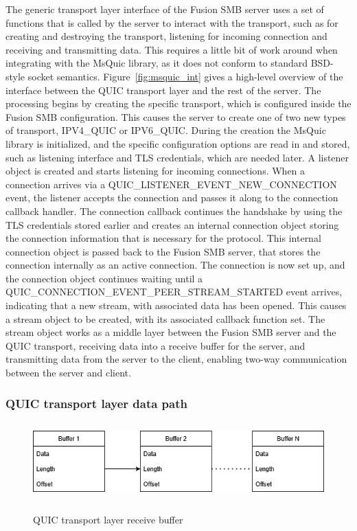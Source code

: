 \documentclass[english, 12pt, a4paper, elec, utf8, a-2b, online]{aaltothesis}
\begin{document}
The generic transport layer interface of the Fusion SMB server uses a set of functions
that is called by the server to interact with the transport, such as for creating and
destroying the transport, listening for incoming connection and receiving and transmitting data.
This requires a little bit of work around when integrating with the MsQuic library, as
it does not conform to standard BSD-style socket semantics. Figure~\ref{fig:msquic_int}
gives a high-level overview of the interface between the QUIC transport layer and the
rest of the server. The processing begins by creating the specific transport, which
is configured inside the Fusion SMB configuration. This causes the server to create
one of two new types of transport, IPV4\_QUIC or IPV6\_QUIC. During the creation the MsQuic
library is initialized, and the specific configuration options are read in and stored,
such as listening interface and TLS credentials, which are needed later. A listener
object is created and starts listening for incoming connections. When a connection
arrives via a QUIC\_LISTENER\_EVENT\_NEW\_CONNECTION event, the listener accepts the
connection and passes it along to the
connection callback handler. The connection callback continues the handshake by using the TLS
credentials stored earlier and creates an internal connection object storing
the connection information that is necessary for the protocol. This internal connection
object is passed back to the Fusion SMB server, that stores the connection internally
as an active connection. The connection is now set up, and the connection object continues waiting
until a QUIC\_CONNECTION\_EVENT\_PEER\_STREAM\_STARTED event arrives, indicating
that a new stream, with associated data has been opened. This causes a stream object
to be created, with its associated callback function set. The stream object works
as a middle layer between the Fusion SMB server and the QUIC transport, receiving
data into a receive buffer for the server, and transmitting data from the server to
the client, enabling two-way communication between the server and client.

\subsubsection{QUIC transport layer data path}
\begin{figure}[h]
	\centering
	\includegraphics[alt={Block diagram of the receive buffer of the QUIC layer}, height=3cm]{./images/quic_buffer.png}
	\caption{QUIC transport layer receive buffer}
	\label{fig:msquic_buf}
\end{figure}
\end{document}

